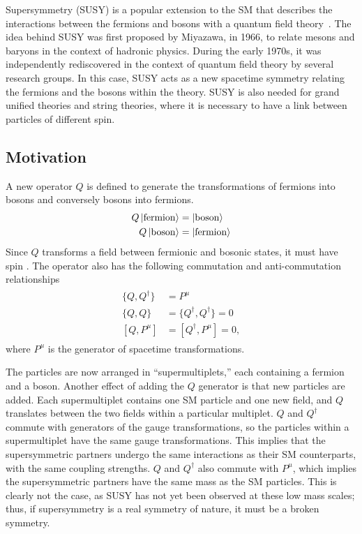 Supersymmetry (SUSY) is a popular extension to the SM that describes the
interactions between the fermions and bosons with a quantum field
theory~\cite{Miyazawa:1966,PhysRev.170.1586,Volkov:1972jx,Volkov:1973ix,
  Volkov:1973jd,Ramond:1971gb,Golfand:1971iw,Neveu:1971rx,Neveu:1971iv,
  Gervais:1971ji,Wess:1973kz,Wess:1974tw}.
The idea behind SUSY was first proposed by Miyazawa, in 1966, to relate
mesons and baryons in the context of hadronic
physics.
During the early 1970s, it was independently rediscovered in the context of
quantum field theory by several research groups.
In this case, SUSY acts as a new spacetime symmetry relating the fermions and
the bosons within the theory.
SUSY is also needed for grand unified theories and string theories, where it is
necessary to have a link between particles of different spin.

\FloatBarrier
\subsection{Motivation}
\label{sec:susy_motivation}

A new operator $Q$ is defined to generate the transformations of fermions into
bosons and conversely bosons into fermions.
\begin{align}
  \begin{split}
    Q\ket{\mathrm{fermion}} & = \ket{\mathrm{boson}} \\
    Q\ket{\mathrm{boson}}   & = \ket{\mathrm{fermion}}
  \end{split}
\end{align}
Since $Q$ transforms a field between fermionic and bosonic states, it must
have spin .
The operator also has the following commutation and anti-commutation
relationships
\begin{align}
  \begin{split}
    \{Q, Q^{\dagger}\} & = P^{\mu} \\
    \{Q, Q\}           & = \{Q^{\dagger}, Q^{\dagger}\} = 0 \\
    [Q, P^{\mu}]       & = [Q^{\dagger}, P^{\mu}] = 0,
  \end{split}
\end{align}
where $P^{\mu}$ is the generator of spacetime transformations.

The particles are now arranged in ``supermultiplets,'' each containing a
fermion and a boson.
Another effect of adding the $Q$ generator is that new particles are added.
Each supermultiplet contains one SM particle and one new field, and $Q$
translates between the two fields within a particular multiplet.
$Q$ and $Q^{\dagger}$ commute with generators of the gauge transformations,
so the particles within a supermultiplet have the same gauge transformations.
This implies that the supersymmetric partners undergo the same interactions as
their SM counterparts, with the same coupling strengths.
$Q$ and $Q^{\dagger}$ also commute with $P^{\mu}$, which implies the
supersymmetric partners have the same mass as the SM particles.
This is clearly not the case, as SUSY has not yet been observed at these low
mass scales; thus, if supersymmetry is a real symmetry of nature, it must be
a broken symmetry.

